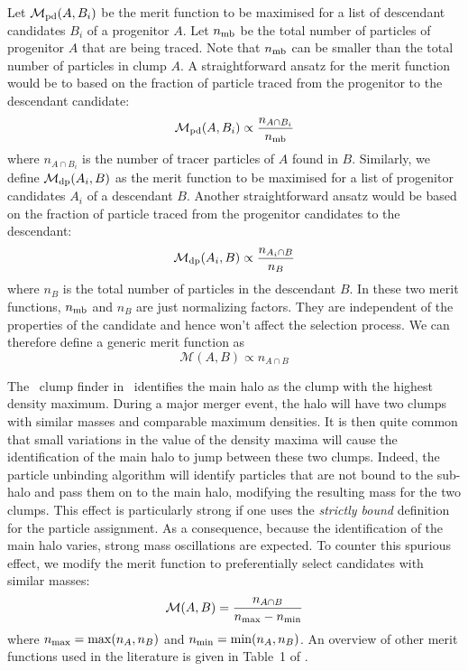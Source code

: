 Let $\mathcal{M}_{\rm pd}(A,B_i)$ be the merit function to be
maximised for a list of descendant candidates $B_i$ of a progenitor
$A$. Let $n_{\rm mb}$ be the total number of particles of progenitor
$A$ that are being traced. Note that $n_{\rm mb}$ can be smaller than the
total number of particles in clump $A$.  A straightforward ansatz for
the merit function would be to based on the fraction of particle traced from the
progenitor to the descendant candidate:
\begin{equation}
\mathcal{M}_{\rm pd}(A,B_i) \propto \frac{n_{A \cap B_i}}{n_{\rm mb}}
\end{equation}
where $n_{A \cap B_i}$ is the number of tracer particles of $A$ found
in $B$.  Similarly, we define $\mathcal{M}_{\rm dp}(A_i,B)$ as the
merit function to be maximised for a list of progenitor candidates
$A_i$ of a descendant $B$. Another straightforward ansatz would be
based on the fraction of particle traced from the progenitor
candidates to the descendant:
\begin{equation}
\mathcal{M}_{\rm dp}(A_i,B) \propto \frac{n_{A_i \cap B}}{n_B}
\end{equation}
where $n_B$ is the total number of particles in the descendant $B$.
In these two merit functions, $n_{\rm mb}$ and $n_B$ are just
normalizing factors. They are independent of the properties of the
candidate and hence won't affect the selection process.  We can
therefore define a generic merit function as
\begin{equation}
\mathcal{M}(A,B) \propto n_{A \cap B}
\end{equation}

The \phew\ clump finder in \ramses\ identifies the main halo as the
clump with the highest density maximum.  During a major merger event,
the halo will have two clumps with similar masses and comparable
maximum densities.  It is then quite common that small variations in
the value of the density maxima will cause the identification of the
main halo to jump between these two clumps.  Indeed, the particle
unbinding algorithm will identify particles that are not bound to the
sub-halo and pass them on to the main halo, modifying the resulting
mass for the two clumps.  This effect is particularly strong if one
uses the {\it strictly bound} definition for the particle
assignment. As a consequence, because the identification of the main
halo varies, strong mass oscillations are expected. To counter this
spurious effect, we modify the merit function to preferentially select candidates with similar masses:
\begin{equation}
\mathcal{M}(A,B) = \frac{n_{A \cap B}}{n_{\rm max} - n_{\rm min}} \label{eq:merit}
\end{equation}
where $n_{\rm max}=\max(n_A,n_B)$ and $n_{\rm min}=\min(n_A,n_B)$.  An
overview of other merit functions used in the literature is given in
Table~1 of \cite{SUSSING_COMPARISON}.




